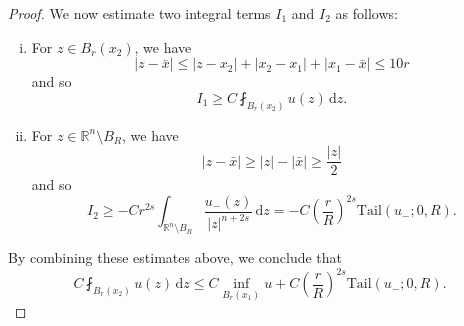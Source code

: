 \documentclass[11pt]{amsart}
\theoremstyle{plain}
\theoremstyle{definition}
\numberwithin{equation}{section}
\begin{document}
\begin{proof}
    We now estimate two integral terms $I_1$ and $I_2$ as follows:
    \begin{enumerate}[(i)]
    \item  For $z \in B_r(x_2)$, we have 
    \begin{equation*}
        |z-\bar x| \leq |z-x_2|+|x_2-x_1|+|x_1-\bar x| \leq 10r
    \end{equation*}
    and so 
    \begin{equation*}
        I_1 \geq C \fint_{B_r(x_2)}u(z)\,\mathrm{d}z.
    \end{equation*}
    
    \item For $z \in \mathbb{R}^n \setminus B_R$, we have 
    \begin{equation*}
        |z-\bar x| \geq |z|-|\bar x| \geq \frac{|z|}{2}
    \end{equation*}
    and so 
    \begin{equation*}
       I_2 \geq -Cr^{2s}\int_{\mathbb{R}^n \setminus B_R} \frac{u_-(z)}{|z|^{n+2s}}\,\mathrm{d}z=-C\left(\frac{r}{R}\right)^{2s}\mathrm{Tail}(u_-; 0, R).
    \end{equation*}
    \end{enumerate}

    By combining these estimates above, we conclude that
    \begin{equation*}
       C \fint_{B_r(x_2)}u(z)\,\mathrm{d}z \leq C\inf_{B_r(x_1)}u+C\left(\frac{r}{R}\right)^{2s}\mathrm{Tail}(u_-; 0, R).
    \end{equation*}
\end{proof}
\end{document}

